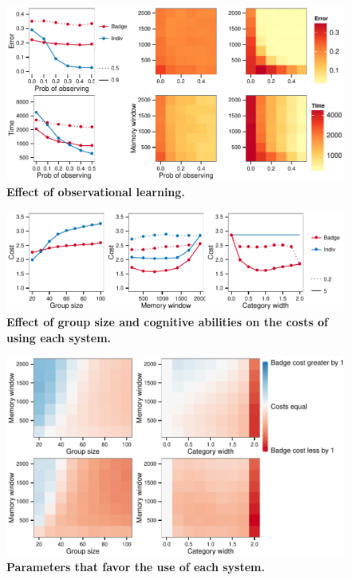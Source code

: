 \begin{figure}
\label{costs}
\includegraphics[width=6.85in]{figures/observational_learning.pdf}
\caption{\sffamily\small\textbf{Effect of observational learning.}}
\end{figure}

\begin{figure}
\label{costs}
\includegraphics[width=6.85in]{figures/costs.pdf}
\caption{\sffamily\small\textbf{Effect of group size and cognitive abilities on the costs of using each system.}}
\end{figure}

\begin{figure}
\label{comparison}
\includegraphics[width=6.85in]{figures/cost_comparisons.pdf}
\caption{\sffamily\small\textbf{Parameters that favor the use of each system.}}
\end{figure}

